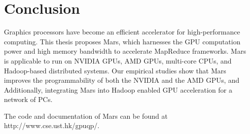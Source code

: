 \chapter{Conclusion}\label{sec-conclusion}
Graphics processors have become an efficient accelerator for
high-performance computing. This thesis proposes Mars, which
harnesses the GPU computation power and high memory bandwidth to
accelerate MapReduce frameworks. Mars is applicable to run on
NVIDIA GPUs, AMD GPUs, multi-core CPUs, and Hadoop-based distributed systems. 
Our empirical studies show that Mars
improves the programmability of both the NVIDIA and the AMD GPUs,
and  Additionally, integrating Mars into Hadoop enabled GPU acceleration for a network of PCs.

The code and documentation of Mars can be found at
http://www.cse.ust.hk/gpuqp/.

